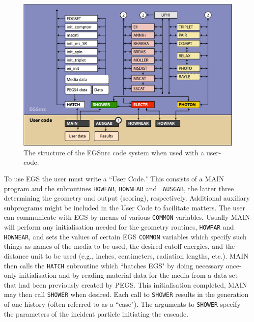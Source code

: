 \begin{figure}[hbtp]
   \begin{center}
   \leavevmode
   \mbox{}\hspace{-1mm}
   \includegraphics[width=16cm]{figures/egs-diagram}
   \end{center}
   \caption{The structure of the EGSnrc code system when used with a
user-code.}
   \label{fig_egsnrc_structure}
\end{figure}

To use EGS the user must write a ``User Code."  This consists of a
MAIN program and the subroutines {\tt HOWFAR}, {\tt HOWNEAR} and {\tt
AUSGAB}, the latter three determining the geometry and output (scoring),
respectively.  Additional auxiliary subprograms might be included in the
User Code to facilitate matters.  The user can communicate with EGS by
means of various {\tt COMMON} variables.  Usually MAIN will perform
any initialisation needed for the geometry routines, {\tt HOWFAR}
and {\tt HOWNEAR}, and sets the values of certain EGS {\tt COMMON}
variables which specify such things as names of the media to be used,
the desired cutoff energies, and the distance unit to be used (e.g.,
inches, centimeters, radiation lengths, etc.).  MAIN then calls the
{\tt HATCH} subroutine which ``hatches EGS" by doing necessary once-only
initialisation and by reading material data for the media from a data set
that had been previously created by PEGS.  This initialisation completed,
MAIN may then call {\tt SHOWER} when desired.  Each call to {\tt SHOWER}
results in the generation of one history (often referred to as a ``case").
The arguments to {\tt SHOWER} specify the parameters of the incident
particle initiating the cascade.


